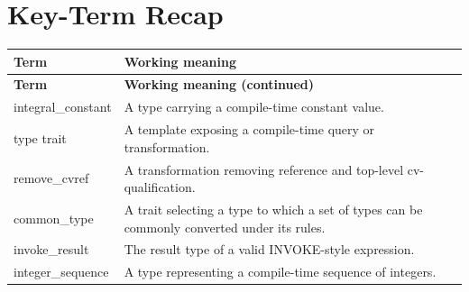 \documentclass[11pt,letterpaper]{article}
\begin{document}
\section{Key-Term Recap}
\begin{longtable}{@{}>{\RaggedRight\arraybackslash}p{}>{\RaggedRight\arraybackslash}p{}@{}}\toprule\textbf{Term} & \textbf{Working meaning}\\\midrule\endfirsthead\toprule\textbf{Term} & \textbf{Working meaning (continued)}\\\midrule\endhead\bottomrule\endfoot
integral\_\allowbreak{}constant & A type carrying a compile-time constant value.\\
type trait & A template exposing a compile-time query or transformation.\\
remove\_\allowbreak{}cvref & A transformation removing reference and top-level cv-qualification.\\
common\_\allowbreak{}type & A trait selecting a type to which a set of types can be commonly converted under its rules.\\
invoke\_\allowbreak{}result & The result type of a valid INVOKE-style expression.\\
integer\_\allowbreak{}sequence & A type representing a compile-time sequence of integers.\\
\end{longtable}
\end{document}
